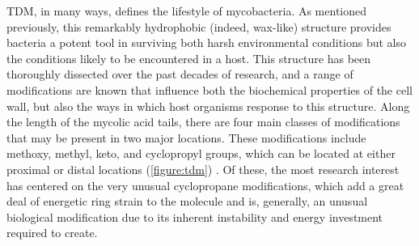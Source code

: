 TDM, in many ways, defines the lifestyle of mycobacteria. As mentioned previously, this remarkably hydrophobic (indeed, wax\hyp{}like) structure provides bacteria a potent tool in surviving both harsh environmental conditions but also the conditions likely to be encountered in a host. This structure has been thoroughly dissected over the past decades of research, and a range of modifications are known that influence both the biochemical properties of the cell wall, but also the ways in which host organisms response to this structure. Along the length of the mycolic acid tails, there are four main classes of modifications that may be present in two major locations. These modifications include methoxy, methyl, keto, and cyclopropyl groups, which can be located at either proximal or distal locations (\autoref{figure:tdm}) \citep{Takayama2005, Rao2005, Rao2006, Bhatt2008, Sugawara2002, Walton2018, Barkan2009, Minnikin2002}. Of these, the most research interest has centered on the very unusual cyclopropane modifications, which add a great deal of energetic ring strain to the molecule and is, generally, an unusual biological modification due to its inherent instability and energy investment required to create.

